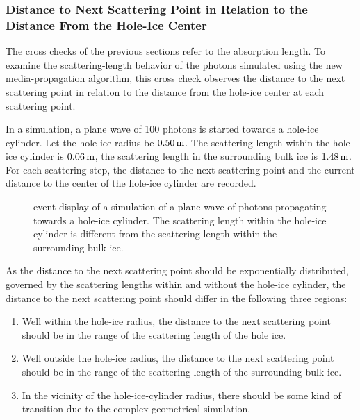 \FloatBarrier
\subsubsection{Distance to Next Scattering Point in Relation to the Distance From the Hole-Ice Center}
\label{sec:cross_check_71}

The cross checks of the previous sections refer to the absorption
length. To examine the scattering-length behavior of the photons
simulated using the new media-propagation algorithm, this cross check
observes the distance to the next scattering point in relation to the
distance from the hole-ice center at each scattering point.

In a simulation, a plane wave of 100 photons is started towards a
hole-ice cylinder. Let the hole-ice radius be \(0.50\text{\,m}\). The scattering
length within the hole-ice cylinder is \(0.06\text{\,m}\), the scattering length
in the surrounding bulk ice is \(1.48\text{\,m}\). For each scattering step, the
distance to the next scattering point and the current distance to the
center of the hole-ice cylinder are recorded.


\begin{figure}[htbp]
  \caption{\steamshovel event display of a simulation of a plane wave of photons propagating towards a hole-ice cylinder. The scattering length within the hole-ice cylinder is different from the scattering length within the surrounding bulk ice.}
  \label{fig:An7ik8pu}
\end{figure}

As the distance to the next scattering point should be exponentially
distributed, governed by the scattering lengths within and without the
hole-ice cylinder, the distance to the next scattering point should
differ in the following three regions:

\begin{enumerate}
  \item Well within the hole-ice radius, the distance to the next scattering point should be in the range of the scattering length of the hole ice.
  \item Well outside the hole-ice radius, the distance to the next scattering point should be in the range of the scattering length of the surrounding bulk ice.
  \item In the vicinity of the hole-ice-cylinder radius, there should be some kind of transition due to the complex geometrical simulation.
\end{enumerate}

